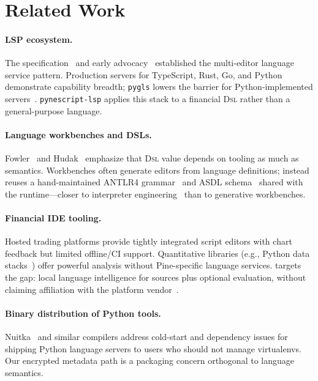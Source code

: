 \documentclass[11pt,a4paper]{article}
\begin{document}
\section{Related Work}
\label{sec:related}

\paragraph{LSP ecosystem.}
The \lsp{} specification~\citep{lsp2023} and early advocacy~\citep{voutilainen2016lsp}
established the multi-editor language service pattern. Production servers for
TypeScript, Rust, Go, and Python demonstrate capability breadth; \texttt{pygls}
lowers the barrier for Python-implemented servers~\citep{murphy2020pygls}.
\texttt{pynescript-lsp} applies this stack to a financial \textsc{Dsl} rather than a
general-purpose language.

\paragraph{Language workbenches and DSLs.}
Fowler~\citep{fowler2010dsl} and Hudak~\citep{hudak1996dsl} emphasize that
\textsc{Dsl} value depends on tooling as much as semantics. Workbenches often generate
editors from language definitions; \pyne{} instead reuses a hand-maintained ANTLR4
grammar~\citep{parr2013antlr,parr2011allstar} and ASDL schema~\citep{wang1997asdl}
shared with the runtime---closer to interpreter engineering~\citep{nystrom2021crafting}
than to generative workbenches.

\paragraph{Financial IDE tooling.}
Hosted trading platforms provide tightly integrated script editors with chart
feedback but limited offline/CI support. Quantitative libraries (e.g., Python
data stacks~\citep{brooks2015python,harris2020numpy}) offer powerful analysis without
Pine-specific language services. \pyne{} targets the gap: local language intelligence
for \pine{} sources plus optional evaluation, without claiming affiliation with the
platform vendor~\citep{tradingview-pine}.

\paragraph{Binary distribution of Python tools.}
Nuitka~\citep{nuitka} and similar compilers address cold-start and dependency issues
for shipping Python language servers to users who should not manage virtualenvs. Our
encrypted metadata path is a packaging concern orthogonal to language semantics.
\end{document}
